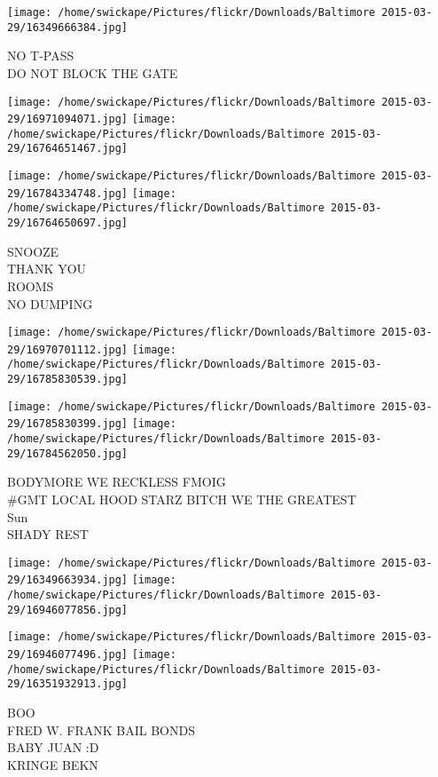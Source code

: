 \documentclass[10pt,letterpaper]{article}
\begin{document}
\vspace{0.25in}
\texttt{[image: /home/swickape/Pictures/flickr/Downloads/Baltimore 2015-03-29/16349666384.jpg]}

NO T{-}PASS\\
DO NOT BLOCK THE GATE
\pagebreak

\texttt{[image: /home/swickape/Pictures/flickr/Downloads/Baltimore 2015-03-29/16971094071.jpg]}
\texttt{[image: /home/swickape/Pictures/flickr/Downloads/Baltimore 2015-03-29/16764651467.jpg]}

\texttt{[image: /home/swickape/Pictures/flickr/Downloads/Baltimore 2015-03-29/16784334748.jpg]}
\texttt{[image: /home/swickape/Pictures/flickr/Downloads/Baltimore 2015-03-29/16764650697.jpg]}

SNOOZE\\
THANK YOU\\
ROOMS\\
NO DUMPING
\pagebreak

\texttt{[image: /home/swickape/Pictures/flickr/Downloads/Baltimore 2015-03-29/16970701112.jpg]}
\texttt{[image: /home/swickape/Pictures/flickr/Downloads/Baltimore 2015-03-29/16785830539.jpg]}

\texttt{[image: /home/swickape/Pictures/flickr/Downloads/Baltimore 2015-03-29/16785830399.jpg]}
\texttt{[image: /home/swickape/Pictures/flickr/Downloads/Baltimore 2015-03-29/16784562050.jpg]}

BODYMORE WE RECKLESS FMOIG\\
\#GMT LOCAL HOOD STARZ BITCH WE THE GREATEST\\
Sun\\
SHADY REST
\pagebreak

\texttt{[image: /home/swickape/Pictures/flickr/Downloads/Baltimore 2015-03-29/16349663934.jpg]}
\texttt{[image: /home/swickape/Pictures/flickr/Downloads/Baltimore 2015-03-29/16946077856.jpg]}

\texttt{[image: /home/swickape/Pictures/flickr/Downloads/Baltimore 2015-03-29/16946077496.jpg]}
\texttt{[image: /home/swickape/Pictures/flickr/Downloads/Baltimore 2015-03-29/16351932913.jpg]}

BOO\\
FRED W. FRANK BAIL BONDS\\
BABY JUAN :D\\
KRINGE BEKN
\pagebreak
\end{document}
